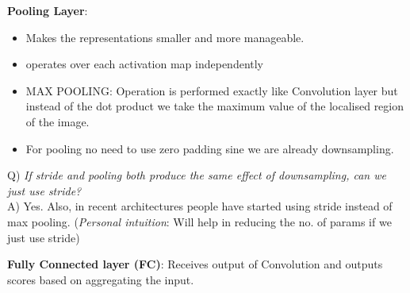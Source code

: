 \documentclass[twoside]{article}
\begin{document}
\textbf{Pooling Layer}:
\begin{itemize}
    \item Makes the representations smaller and more manageable.
    \item operates over each activation map independently
    \item MAX POOLING: Operation is performed exactly like Convolution layer but instead of the dot product we take the maximum value of the localised region of the image.
    \item For pooling no need to use zero padding sine we are already downsampling.
\end{itemize}

Q) \textit{If stride and pooling both produce the same effect of downsampling, can we just use stride?}\\
A) Yes. Also, in recent architectures people have started using stride instead of max pooling. (\textit{Personal intuition}: Will help in reducing the no. of params if we just use stride) 

\textbf{Fully Connected layer (FC)}: Receives output of Convolution and outputs scores based on aggregating the input.


\end{document}
